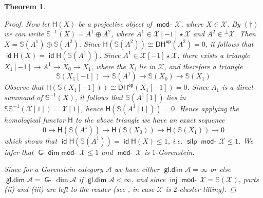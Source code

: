 \documentclass[oneside, a4paper,reqno]{amsart}
\numberwithin{equation}{section}
\newtheorem{thm}{Theorem}[section]
\theoremstyle{definition}
\begin{document}
\begin{thm}
\begin{proof}
 Now let $\mathsf{H}(X)$ be a projective object of $\operatorname*{\mathsf{mod}-\!}{\mathcal X}$, where $X \in {\mathcal X}$.  By $(\dag)$ we can write $\mathbb S^{-1}(X) = A^{1} \oplus A^{2}$, where $A^{1} \in {\mathcal X}[-1]\star{\mathcal X}$ and $A^{2} \in {^{\bot}}{\mathcal X}$. Then $X = \mathbb S(A^{1}) \oplus \mathbb S(A^{2})$. Since $\mathsf{H}(\mathbb S(A^{2})) \cong \mathsf{D}\mathsf{H}^\operatorname*{\mathsf{op}}(A^{2}) = 0$, it follows that $\operatorname*{\mathsf{id}}\mathsf{H}(X) = \operatorname*{\mathsf{id}}\mathsf{H}(\mathbb S(A^{1}))$. Since $A^{1} \in {\mathcal X}[-1]\star{\mathcal X}$, there exists a triangle $X_{1}[-1] {\longrightarrow} A^{1} {\longrightarrow} X_{0} {\longrightarrow} X_{1}$, where the $X_{i}$ lie in ${\mathcal X}$, and therefore a triangle 
\[
\mathbb S(X_{1}[-1]) {\longrightarrow} \mathbb S(A^{1}) {\longrightarrow} \mathbb S(X_{0}) {\longrightarrow} \mathbb S(X_{1})
\]
 Observe that 
$\mathsf{H}(\mathbb S(X_{1}[-1])) \cong \mathsf{D}\mathsf{H}^\operatorname*{\mathsf{op}}(X_{1}[-1]) = 0$.  Since $A_{1}$ is a direct summand of $\mathbb S^{-1}(X)$, it follows that  $\mathbb S(A^{1}[1])$ lies in $\mathbb S\mathbb S^{-1}({\mathcal X}[1]) = {\mathcal X}[1]$, hence $\mathsf{H}(\mathbb S(A^{1}[1])) = 0$.  Hence applying the homological functor $\mathsf{H}$ to the above triangle we have an exact sequence 
\[
0 {\longrightarrow} \mathsf{H}(\mathbb S(A^{1})) {\longrightarrow} \mathsf{H}(\mathbb S(X_{0})) {\longrightarrow} \mathsf{H}(\mathbb S(X_{1})) {\longrightarrow} 0
\]
which shows that $\operatorname*{\mathsf{id}} \mathsf{H}(\mathbb S(A^{1})) = \operatorname*{\mathsf{id}}\mathsf{H}(X) \leq 1$, i.e. $\operatorname*{\mathsf{silp}}\operatorname*{\mathsf{mod}-\!}{\mathcal X} \leq 1$. 
 We infer that $\operatorname*{\mathsf{G}-\!}\mathsf{dim}\operatorname*{\mathsf{mod}-\!}{\mathcal X} \leq 1$ and  $\operatorname*{\mathsf{mod}-\!}{\mathcal X}$  is $1$-Gorenstein.
 
 Since for a Gorenstein category ${\mathscr A}$ we have either $\operatorname*{\mathsf{gl.dim}}{\mathscr A} = \infty$ or else $\operatorname*{\mathsf{gl.dim}}{\mathscr A} = \operatorname*{\mathsf{G}-\!}\dim{\mathscr A}$ if $\operatorname*{\mathsf{gl.dim}}{\mathscr A} < \infty$, and since $\operatorname*{\mathsf{inj}}\operatorname*{\mathsf{mod}-\!}{\mathcal X} = \mathbb S({\mathcal X})$, parts (ii) and (iii) are left to the reader (see \cite{KR1}, \cite{KZ} in  case  ${\mathcal X}$ is $2$-cluster tilting). 
\end{proof}
\end{thm} 
\end{document}
